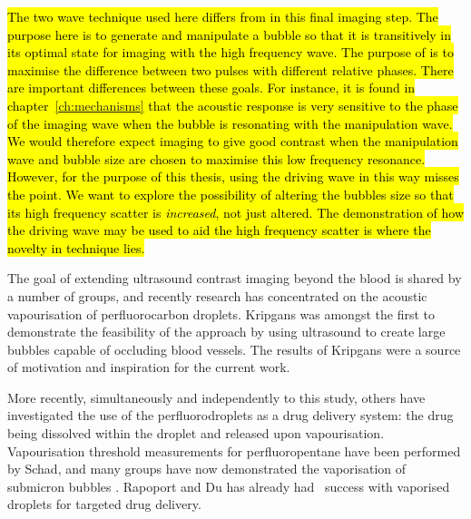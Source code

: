 \hl{The two wave technique used here differs from {}  in this final imaging step.
  The purpose here is to generate and manipulate a bubble so that it is transitively in its optimal state for imaging with the high frequency wave.  
  The purpose of {} is to maximise the difference between two pulses with different relative phases.
  There are important differences between these goals.
  For instance, it is found in chapter~{\ref{ch:mechanisms}} that the acoustic response is very sensitive to the phase of the imaging wave when the bubble is resonating with the manipulation wave.
  We would therefore expect {} imaging to give good contrast when the manipulation wave and bubble size are chosen to maximise this low frequency resonance.
  However, for the purpose of this thesis, using the driving wave in this way misses the point.
  We want to explore the possibility of altering the bubbles size so that its high frequency scatter is \emph{increased}, not just altered.
  The demonstration of how the driving wave may be used to aid the high frequency scatter is where the novelty in technique lies.
}


The goal of extending ultrasound contrast imaging beyond the blood is shared by a number of groups,
and recently research has concentrated on the acoustic vapourisation of perfluorocarbon droplets\cite{Burns2010,Rapoport2007,Fabiilli2010,Giesecke2003,Couture2006,Sheeran2013,Doinikov2014,Shpak2013,Lin2013}.
Kripgans\cite{Kripfgans2000, Kripfgans2002,Kripfgans2004} was amongst the first 
to demonstrate the feasibility of the approach %
by using ultrasound to create large bubbles capable of occluding blood vessels.
The results of Kripgans were a source of motivation and inspiration for the current work.


More recently, simultaneously and independently to this study,
others have investigated the use of the perfluorodroplets as a drug delivery system:
the drug being dissolved within the droplet and released upon vapourisation\cite{Fabiilli2010}.
Vapourisation threshold measurements for perfluoropentane have been performed by Schad\cite{Schad2009},
and many groups have now demonstrated the vaporisation of submicron bubbles\cite{Burns2010,Sheeran2013,Rapoport2010,Lin2013} .
Rapoport and Du \cite{Rapoport2007,Du2011} has already had \invivo\ success with vaporised droplets for targeted drug delivery.


